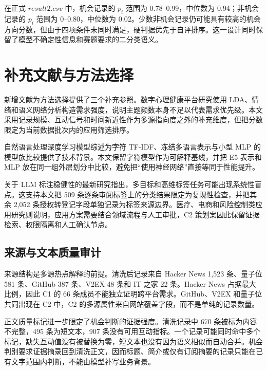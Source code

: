 在正式 $result2.csv$ 中，机会记录的 $p_i$ 范围为 0.78--0.99，中位数为 0.94；非机会记录的 $p_i$ 范围为 0--0.80，中位数为 0.02。少数非机会记录仍可能具有较高的机会方向分数，但由于四项条件未同时满足，硬判据优先于自评排序。这一设计同时保留了模型不确定性信息和赛题要求的二分类语义。

\section{补充文献与方法选择}

新增文献为方法选择提供了三个补充参照。数字心理健康平台研究使用 LDA、情绪和语义网络分析构造需求强度，说明主题频数本身不足以代表需求优先级\cite{wu2026needs}。本文采用记录规模、互动信号和时间新近性作为多源指向度之外的补充维度，但把分数限定为当前数据批次内的应用筛选排序。

自然语言处理深度学习模型综述为字符 TF-IDF、冻结多语言表示与小型 MLP 的模型族比较提供了技术背景\cite{he2025nlp}。本文保留字符模型作为可解释基线，并把 E5 表示和 MLP 放在同一组外层划分中比较，避免把“使用神经网络”直接等同于性能提升。

关于 LLM 标注稳健性的最新研究指出，多目标和高维标签任务可能出现系统性盲点\cite{senthilkumar2026brittle}。这支持本文把 509 条逐条审阅标签上的分类结果限定为复现性检查，并把其余 2,052 条授权转登记字段单独记录为标签来源边界。医疗、电商和风险控制类应用研究则说明，应用方案需要结合领域流程与人工审批，C2 策划案因此保留证据检索、权限隔离和人工确认节点\cite{shi2026tcm,he2024ecommerce}。

\subsection{来源与文本质量审计}

来源结构是多源热点解释的前提。清洗后记录来自 Hacker News 1,523 条、量子位 581 条、GitHub 387 条、V2EX 48 条和 IT 之家 22 条。Hacker News 占据最大比例，因此 C1 的 66 条成员不能独立证明跨平台需求。GitHub、V2EX 和量子位共同出现在 C2 中，C2 的多源属性来自网站覆盖字段，而不是单纯的记录数量。

正文质量标记进一步限定了机会判断的证据强度。清洗记录中 670 条被标为内容不完整，495 条为短文本，907 条没有可用互动指标。一个记录可能同时命中多个标记，缺失互动值没有被替换为零，短文本也没有因为语义相似而自动合并。机会判别要求证据摘录回到清洗正文，因而标题、简介或仅有订阅摘要的记录只能在已有文字范围内判断，不能由模型补写业务背景。

